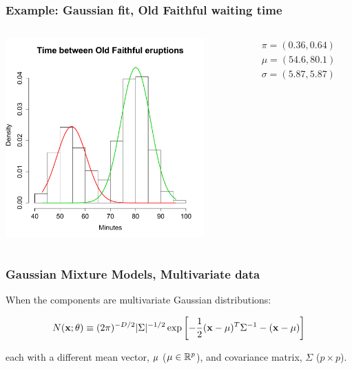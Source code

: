 \documentclass{beamer}
\begin{document}
\begin{frame}
  \frametitle{Example: Gaussian fit, Old Faithful waiting time}

\vspace*{-0.15in}
\begin{columns}
\begin{column}{7cm}
\begin{center}
\includegraphics[height=3in]{waiting-fit.pdf}
\end{center}
\end{column}


\begin{column}{5cm}
\begin{eqnarray*}
\pi = (0.36, 0.64)\\
\mu = (54.6, 80.1)\\
\sigma = (5.87, 5.87)
\end{eqnarray*}
\end{column}

\end{columns}



\end{frame}





\begin{frame}
  \frametitle{Gaussian Mixture Models, Multivariate data}

When the components are multivariate Gaussian distributions:

\[
N(\mathbf{x};\mathbf{\theta}) \equiv (2\pi)^{-D/2}|\Sigma|^{-1/2} \exp
\left[
-\frac{1}{2}(\mathbf{x}-\mathbf{\mu})^{T} \Sigma^{-1} - (\mathbf{x}-\mathbf{\mu})
\right]
\]

each with a different mean vector, $\mathbf{\mu}$ ($\mathbf{\mu} \in \mathbb{R}^p$), and covariance matrix, $\Sigma$ ($p \times p$).

\end{frame}
\end{document}
